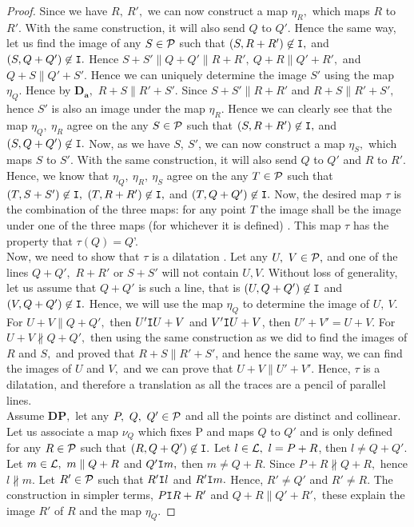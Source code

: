 \begin{proof}
    Since we have $R, \ R',$ we can now construct a map $\eta_R,$ which maps $R$ to $R'.$ With the same construction, it will also send $Q$ to $Q'.$ Hence the same way, let us find the image of any $S \in \mathcal{P}$ such that $(S, R+R') \not \in \texttt{I},$ and $(S, Q+Q') \not \in \texttt{I}.$ Hence $S+S' \parallel Q+Q' \parallel R+R', \ Q+R \parallel Q'+R',$ and $Q+S \parallel Q'+S'.$  Hence we can uniquely determine the image $S'$ using the map $\eta_Q.$ Hence by $\mathbf{D_a},$ $R+S \parallel  R'+S'.$ Since $S+S' \parallel R+R'$ and $R+S \parallel  R'+S',$ hence $S'$ is also an image under the map $\eta_R$. Hence we can clearly see that the map $\eta_Q, \ \eta_R$ agree on the any $S \in \mathcal{P}$ such that $(S, R+R') \not \in \texttt{I},$ and $(S, Q+Q') \not \in \texttt{I}.$ Now, as we have $S, \ S'$, we can now construct a map $\eta_S,$ which maps $S$ to $S'.$ With the same construction, it will also send $Q$ to $Q'$ and $R$ to $R'.$ Hence, we know that $\eta_Q, \ \eta_R, \  \eta_S$ agree on the any $T \in \mathcal{P}$ such that $(T, S+S') \not \in \texttt{I},$ $(T, R+R') \not \in \texttt{I},$ and $(T, Q+Q') \not \in \texttt{I}.$ Now, the desired map $\tau$ is the combination of the three maps: for any point $T$ the image shall be the image under one of the three maps (for whichever it is defined) . This map $\tau$ has the property that $\tau(Q ) = Q$'. \\
    
    Now, we need to show that $\tau$ is a dilatation .  Let any $U, \ V \in \mathcal{P},$ and one of the lines $Q+Q',$ $R+R'$ or $S+S'$ will not contain $U, V.$ Without loss of generality, let us assume that $Q+Q'$ is such a line, that is $(U,Q+Q') \not \in \texttt{I}$ and $(V, Q+Q') \not \in \texttt{I}.$ Hence, we will use the map $\eta_Q$ to determine the image of $U, \ V.$ For $U+V \parallel Q+Q',$ then $U'\texttt{I} U+V $ and $ V' \texttt{I} U+V $, then  $U'+V'=U+V.$ For $U+V \not \parallel Q+Q',$ then using the same construction as we did to find the images of $R$ and $S,$ and proved that $R+S \parallel R'+S'$, and hence the same way, we can find the images of $U$ and $V,$ and we can prove that $U+V \parallel U'+V'.$ Hence, $\tau$ is a dilatation, and therefore a translation as all the traces are a pencil of parallel lines. \\

    Assume $\mathbf{DP},$ let any $P, \ Q, \ Q' \in \mathcal{P}$ and all the points are distinct and collinear. Let us associate a map $\nu_Q$ which fixes P and maps $Q$ to $Q'$ and is only defined for any $R \in \mathcal{P}$ such that $(R,Q+Q') \not \in \texttt{I}.$ 
    Let $l \in \mathcal{L}, \ l =P+R$, then $l \neq Q+Q'.$ Let $m \in \mathcal{L}, \ m \parallel Q+R$ and $Q' \texttt{I} m,$ then $m \neq Q+R.$ Since $P+R \not \parallel Q+R,$ hence $l \not \parallel m.$ Let $R' \in \mathcal{P}$ such that $R' \texttt{I} l$ and $R' \texttt{I} m.$ Hence, $R' \neq Q'$ and $R' \neq R.$ The construction in simpler terms, $P \texttt{I} R+R'$ and $Q+R \parallel Q' + R',$ these explain the image $R'$ of $R$ and the map $\eta_Q.$


\end{proof}
